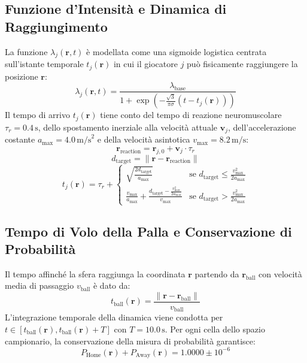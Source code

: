 \documentclass[11pt,a4paper]{article}
\begin{document}
\subsection{Funzione d'Intensità e Dinamica di Raggiungimento}
La funzione $\lambda_j(\mathbf{r}, t)$ è modellata come una sigmoide logistica centrata sull'istante temporale $t_j(\mathbf{r})$ in cui il giocatore $j$ può fisicamente raggiungere la posizione $\mathbf{r}$:
\begin{equation}
\lambda_j(\mathbf{r}, t) = \frac{\lambda_{\text{base}}}{1 + \exp\left( -\frac{\sqrt{3}}{\pi \sigma} (t - t_j(\mathbf{r})) \right)}
\end{equation}
Il tempo di arrivo $t_j(\mathbf{r})$ tiene conto del tempo di reazione neuromuscolare $\tau_r = 0.4\,\text{s}$, dello spostamento inerziale alla velocità attuale $\mathbf{v}_j$, dell'accelerazione costante $a_{\max} = 4.0\,\text{m/s}^2$ e della velocità asintotica $v_{\max} = 8.2\,\text{m/s}$:
\begin{equation}
\mathbf{r}_{\text{reaction}} = \mathbf{r}_{j, 0} + \mathbf{v}_j \cdot \tau_r
\end{equation}
\begin{equation}
d_{\text{target}} = \|\mathbf{r} - \mathbf{r}_{\text{reaction}}\|
\end{equation}
\begin{equation}
t_j(\mathbf{r}) = \tau_r + \begin{cases}
\sqrt{\frac{2 d_{\text{target}}}{a_{\max}}} & \text{se } d_{\text{target}} \le \frac{v_{\max}^2}{2 a_{\max}} \\[0.5em]
\frac{v_{\max}}{a_{\max}} + \frac{d_{\text{target}} - \frac{v_{\max}^2}{2 a_{\max}}}{v_{\max}} & \text{se } d_{\text{target}} > \frac{v_{\max}^2}{2 a_{\max}}
\end{cases}
\end{equation}

\subsection{Tempo di Volo della Palla e Conservazione di Probabilità}
Il tempo affinché la sfera raggiunga la coordinata $\mathbf{r}$ partendo da $\mathbf{r}_{\text{ball}}$ con velocità media di passaggio $v_{\text{ball}}$ è dato da:
\begin{equation}
t_{\text{ball}}(\mathbf{r}) = \frac{\|\mathbf{r} - \mathbf{r}_{\text{ball}}\|}{v_{\text{ball}}}
\end{equation}
L'integrazione temporale della dinamica viene condotta per $t \in [t_{\text{ball}}(\mathbf{r}), t_{\text{ball}}(\mathbf{r}) + T]$ con $T = 10.0\,\text{s}$. Per ogni cella dello spazio campionario, la conservazione della misura di probabilità garantisce:
\begin{equation}
P_{\text{Home}}(\mathbf{r}) + P_{\text{Away}}(\mathbf{r}) = 1.0000 \pm 10^{-6}
\end{equation}
\end{document}
